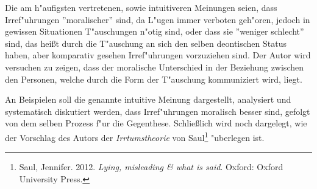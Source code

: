 \documentclass[a4paper]{article}
\begin{document}
Die am h"aufigsten vertretenen, sowie intuitiveren Meinungen seien, dass Irref"uhrungen ''moralischer'' sind, da L"ugen immer verboten geh"oren, jedoch in gewissen Situationen T"auschungen n"otig sind, oder dass sie ''weniger schlecht'' sind, das heißt durch die T"auschung an sich den selben deontischen Status haben, aber komparativ gesehen Irref"uhrungen vorzuziehen sind.
Der Autor wird versuchen zu zeigen, dass der moralische Unterschied in der Beziehung zwischen den Personen, welche durch die Form der T"auschung kommuniziert wird, liegt. 

An Beispielen soll die genannte intuitive Meinung dargestellt, analysiert und systematisch diskutiert werden, dass Irref"uhrungen moralisch besser sind, gefolgt von dem selben Prozess f"ur die Gegenthese. Schließlich wird noch dargelegt, wie der Vorschlag des Autors der \emph{Irrtumstheorie} von Saul\footnote{Saul, Jennifer. 2012. \emph{Lying, misleading \& what is said}. Oxford: Oxford University Press.} "uberlegen ist.


\newpage

\end{document}
